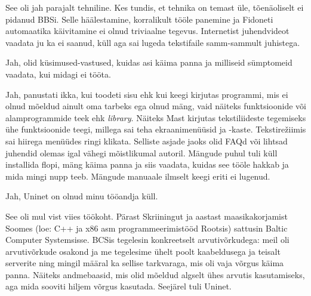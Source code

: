 
See oli jah parajalt tehniline. Kes tundis, et tehnika on temast 
üle, tõenäoliselt ei pidanud BBSi. Selle
häälestamine, korralikult tööle panemine ja Fidoneti 
automaatika käivitamine ei olnud triviaalne tegevus. Internetist juhendvideot vaadata ju ka ei saanud, küll 
aga sai lugeda tekstifaile samm-sammult juhistega.


Jah, olid küsimused-vastused, kuidas asi käima panna ja milliseid sümptomeid vaadata, kui midagi ei tööta.


Jah, panustati ikka, kui toodeti sisu ehk kui keegi kirjutas 
programmi, mis ei olnud mõeldud ainult oma tarbeks ega olnud mäng, 
vaid näiteks funktsioonide või alamprogrammide teek ehk 
\emph{library}. Näiteks Mast kirjutas 
tekstiliideste tegemiseks ühe funktsioonide teegi, millega sai teha ekraanimenüüsid ja 
-kaste. Tekstirežiimis sai
hiirega menüüdes ringi klikata. Selliste asjade jaoks olid 
FAQd või lihtsad juhendid olemas igal vähegi mõistlikumal 
autoril. Mängude puhul tuli küll installida flopi, mäng käima panna
ja siis vaadata, kuidas see tööle hakkab ja mida mingi nupp 
teeb. Mängude manuaale ilmselt keegi eriti ei lugenud.


Jah, Uninet on olnud minu tööandja küll.


See oli mul vist viies töökoht. Pärast Skriiningut ja aastast maasikakorjamist Soomes
(loe: C++ ja x86 asm programmeerimistööd Rootsis) sattusin Baltic 
Computer Systemsisse.
BCSis tegelesin konkreetselt arvutivõrkudega: 
meil oli arvutivõrkude osakond ja me tegelesime ühelt poolt 
kaabeldusega ja teisalt serverite ning mingil määral ka sellise 
tarkvaraga, mis oli vaja võrgus käima panna. Näiteks andmebaasid, mis olid 
mõeldud algselt ühes arvutis kasutamiseks, aga mida sooviti hiljem võrgus kasutada. Seejärel tuli Uninet.

